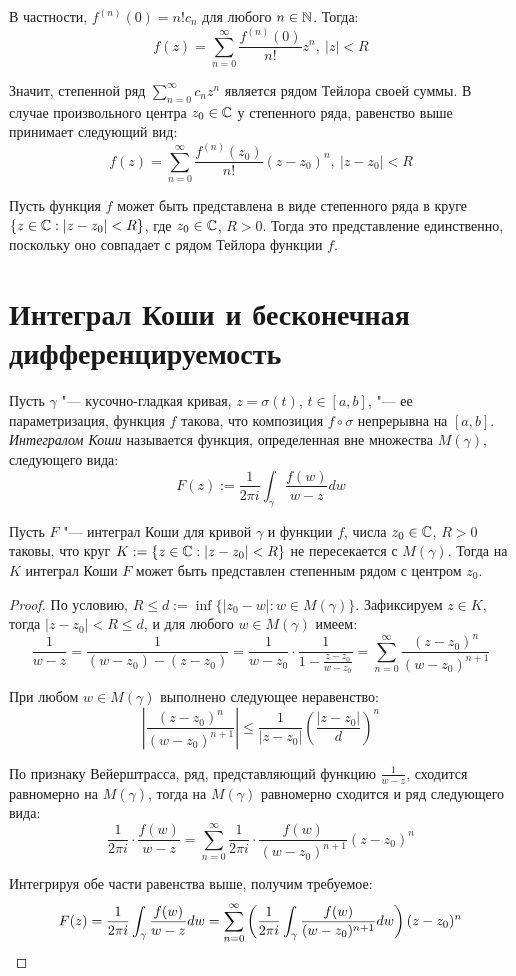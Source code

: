\begin{note}
	В частности, $f^{(n)}(0) = n!c_n$ для любого $n \in \mathbb{N}$. Тогда:
	\[f(z) = \sum_{n=0}^\infty \frac{f^{(n)}(0)}{n!}z^n,~|z| < R\]
	
	Значит, степенной ряд $\sum_{n=0}^\infty c_nz^n$ является рядом Тейлора своей суммы. В случае произвольного центра $z_0 \in \mathbb{C}$ у степенного ряда, равенство выше принимает следующий вид:
	\[f(z) = \sum_{n=0}^\infty \frac{f^{(n)}(z_0)}{n!}(z - z_0)^n,~|z - z_0| < R\]
\end{note}

\begin{note}
	Пусть функция $f$ может быть представлена в виде степенного ряда в круге $\{z \in \mathbb{C} : |z - z_0| < R\}$, где $z_0 \in \mathbb{C}$, $R > 0$. Тогда это представление единственно, поскольку оно совпадает с рядом Тейлора функции $f$.
\end{note}

\section{Интеграл Коши и бесконечная дифференцируемость}

\begin{definition}
	Пусть $\gamma$ "--- кусочно-гладкая кривая, $z = \sigma(t)$, $t \in [a, b]$, "--- ее параметризация, функция $f$ такова, что композиция $f\circ\sigma$ непрерывна на $[a, b]$. \textit{Интегралом Коши} называется функция, определенная вне множества $M(\gamma)$, следующего вида:
	\[F(z) := \frac1{2\pi i}\int_\gamma \frac{f(w)}{w - z}dw\]
\end{definition}

\begin{theorem}
	Пусть $F$ "--- интеграл Коши для кривой $\gamma$ и функции $f$, числа $z_0 \in \mathbb{C}$, $R > 0$ таковы, что круг $K := \{z \in \mathbb{C}: |z - z_0| < R\}$ не пересекается с $M(\gamma)$. Тогда на $K$ интеграл Коши $F$ может быть представлен степенным рядом с центром $z_0$.
\end{theorem}

\begin{proof}
	По условию, $R \le d := \inf\{|z_0 - w| : w \in M(\gamma)\}$. Зафиксируем $z \in K$, тогда $|z - z_0| < R \le d$, и для любого $w \in M(\gamma)$ имеем:
	\[\frac1{w - z} = \frac1{(w-z_0) - (z - z_0)} = \frac1{w-z_0}\cdot \frac1{1 - \frac{z-z_0}{w - z_0}} = \sum_{n=0}^\infty\frac{(z-z_0)^n}{(w-z_0)^{n + 1}}\]
	
	При любом $w \in M(\gamma)$ выполнено следующее неравенство:
	\[\left|\frac{(z-z_0)^n}{(w-z_0)^{n + 1}}\right| \le \frac{1}{|z - z_0|}\left(\frac{|z - z_0|}{d}\right)^n\]
	
	По признаку Вейерштрасса, ряд, представляющий функцию $\frac1{w - z}$, сходится равномерно на $M(\gamma)$, тогда на $M(\gamma)$ равномерно сходится и ряд следующего вида:
	\[\frac1{2\pi i} \cdot\frac{f(w)}{w-z} = \sum_{n=0}^\infty\frac1{2\pi i}\cdot \frac{f(w)}{(w-z_0)^{n + 1}}(z-z_0)^n\]
	
	Интегрируя обе части равенства выше, получим требуемое:
	\[F(z) = \frac1{2\pi i} \int_\gamma \frac{f(w)}{w-z}dw = \sum_{n=0}^\infty\left(\frac1{2\pi i} \int_\gamma\frac{f(w)}{(w-z_0)^{n + 1}}dw\right)(z-z_0)^n \qedhere\]
\end{proof}

